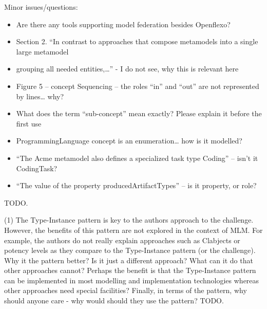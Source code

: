 \documentclass[10pt]{article}
\begin{document}
\begin{response}{Minor issues/questions:} 
\begin{itemize}
    \item Are there any tools supporting model federation besides Openflexo?
    \item Section 2. “In contrast to approaches that compose metamodels into a single large metamodel \item grouping all needed entities,…” - I do not see, why this is relevant here
    \item Figure 5 – concept Sequencing – the roles “in” and “out” are not represented by lines… why?
    \item What does the term “sub-concept” mean exactly? Please explain it before the first use
    \item ProgrammingLanguage concept is an enumeration… how is it modelled?
    \item “The Acme metamodel also defines a specialized task type Coding” – isn’t it CodingTask?
    \item “The value of the property producedArtifactTypes” – is it property, or role?

\end{itemize}
TODO. 
\end{response}


\pagebreak


\begin{response}{(1) The Type-Instance pattern is key to the authors approach to the challenge. However, the benefits of this pattern are not explored in the context of MLM. For example, the authors do not really explain approaches such as Clabjects or potency levels as they compare to the Type-Instance pattern (or the challenge). Why it the pattern better? Is it just a different approach? What can it do that other approaches cannot? Perhaps the benefit is that the Type-Instance pattern can be implemented in most modelling and implementation technologies whereas other approaches need special facilities? Finally, in terms of the pattern, why should anyone care - why would should they use the pattern?} 
TODO.
\end{response}
\end{document}
